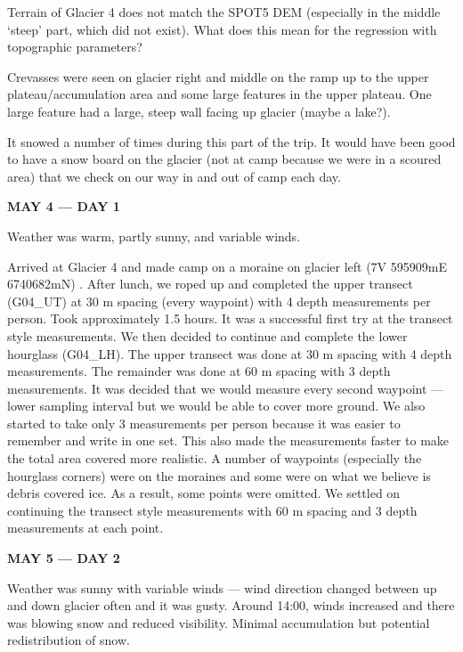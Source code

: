 \documentclass[12pt]{article}
\begin{document}
Terrain of Glacier 4 does not match the SPOT5 DEM (especially in the middle `steep' part, which did not exist). What does this mean for the regression with topographic parameters?

Crevasses were seen on glacier right and middle on the ramp up to the upper plateau/accumulation area and some large features in the upper plateau. One large feature had a large, steep wall facing up glacier (maybe a lake?).

It snowed a number of times during this part of the trip. It would have been good to have a snow board on the glacier (not at camp because we were in a scoured area) that we check on our way in and out of camp each day. 

\vspace{4mm}
\noindent \textbf{MAY 4 --- DAY 1}

Weather was warm, partly sunny, and variable winds. 

Arrived at Glacier 4 and made camp on a moraine on glacier left (7V 595909mE 6740682mN) . After lunch, we roped up and completed the upper transect (G04\_UT) at 30 m spacing (every waypoint) with 4 depth measurements per person. Took approximately 1.5 hours. It was a successful first try at the transect style measurements. We then decided to continue and complete the lower hourglass (G04\_LH). The upper transect was done at 30 m spacing with 4 depth measurements. The remainder was done at 60 m spacing with 3 depth measurements. It was decided that we would measure every second waypoint --- lower sampling interval but we would be able to cover more ground. We also started to take only 3 measurements per person because it was easier to remember and write in one set. This also made the measurements faster to make the total area covered more realistic.  A number of waypoints (especially the hourglass corners) were on the moraines and some were on what we believe is debris covered ice. As a result, some points were omitted. We settled on continuing the transect style measurements with 60 m spacing and 3 depth measurements at each point.

\vspace{4mm}
\noindent \textbf{MAY 5 --- DAY 2}

Weather was sunny with variable winds --- wind direction changed between up and down glacier often and it was gusty. Around 14:00, winds increased and there was blowing snow and reduced visibility. Minimal accumulation but potential redistribution of snow. 
\end{document}
